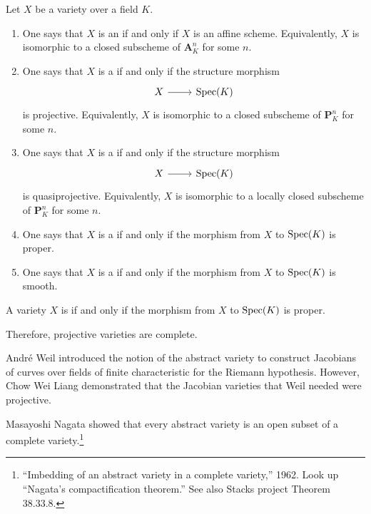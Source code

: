 \documentclass [11 pt, oneside] {article}
\begin{document}
\begin{definition}\label{}\text{}
Let $X$ be a variety over a field $K$.
\begin{enumerate}
	\item One says that $X$ is an  if and only if $X$ is an affine scheme. Equivalently, $X$ is isomorphic to a closed subscheme of $\mathbf{A}^n_K$ for some $n$.
	\item One says that $X$ is a  if and only if the structure morphism 
	\[
\begin{tikzcd}
X\ar[r]&\Spec(K)
\end{tikzcd}
\]  is projective. Equivalently, $X$ is isomorphic to a closed subscheme of $\mathbf{P}^n_K$ for some $n$.
	\item One says that $X$ is a  if and only if the structure morphism 
	\[
\begin{tikzcd}
X\ar[r]&\Spec(K)
\end{tikzcd}
\] 
 is quasiprojective. Equivalently, $X$ is isomorphic to a locally closed subscheme of $\mathbf{P}^n_K$ for some $n$.
	\item One says that $X$ is a  if and only if the morphism from $X$ to $\operatorname{Spec} (K)$ is proper.
	\item One says that $X$ is a  if and only if the morphism from $X$ to $\operatorname{Spec} (K)$ is smooth.
\end{enumerate}
\end{definition}

\begin{definition}[ ]\label{}\text{}
A variety $X$ is  if and only if the morphism from $X$ to $\operatorname{Spec} (K)$ is proper.
\end{definition}

\begin{remark}
	Therefore, projective varieties are complete.
\end{remark}

Andr\'e Weil introduced the notion of the abstract variety to construct Jacobians of curves over fields of finite characteristic for the Riemann hypothesis. However, Chow Wei Liang demonstrated that the Jacobian varieties that Weil needed were projective. 

Masayoshi Nagata showed that every abstract variety is an open subset of a complete variety.\footnote{``Imbedding of an abstract variety in a complete variety,'' 1962. Look up ``Nagata's compactification theorem.'' See also Stacks project Theorem 38.33.8.}
\end{document}
